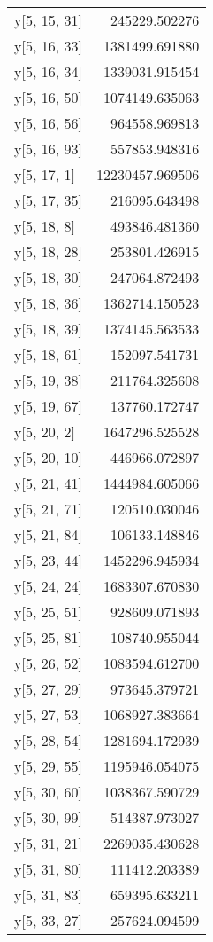 \begin{longtable}{lr}
y[5, 15, 31] & 245229.502276 \\
y[5, 16, 33] & 1381499.691880 \\
y[5, 16, 34] & 1339031.915454 \\
y[5, 16, 50] & 1074149.635063 \\
y[5, 16, 56] & 964558.969813 \\
y[5, 16, 93] & 557853.948316 \\
y[5, 17, 1] & 12230457.969506 \\
y[5, 17, 35] & 216095.643498 \\
y[5, 18, 8] & 493846.481360 \\
y[5, 18, 28] & 253801.426915 \\
y[5, 18, 30] & 247064.872493 \\
y[5, 18, 36] & 1362714.150523 \\
y[5, 18, 39] & 1374145.563533 \\
y[5, 18, 61] & 152097.541731 \\
y[5, 19, 38] & 211764.325608 \\
y[5, 19, 67] & 137760.172747 \\
y[5, 20, 2] & 1647296.525528 \\
y[5, 20, 10] & 446966.072897 \\
y[5, 21, 41] & 1444984.605066 \\
y[5, 21, 71] & 120510.030046 \\
y[5, 21, 84] & 106133.148846 \\
y[5, 23, 44] & 1452296.945934 \\
y[5, 24, 24] & 1683307.670830 \\
y[5, 25, 51] & 928609.071893 \\
y[5, 25, 81] & 108740.955044 \\
y[5, 26, 52] & 1083594.612700 \\
y[5, 27, 29] & 973645.379721 \\
y[5, 27, 53] & 1068927.383664 \\
y[5, 28, 54] & 1281694.172939 \\
y[5, 29, 55] & 1195946.054075 \\
y[5, 30, 60] & 1038367.590729 \\
y[5, 30, 99] & 514387.973027 \\
y[5, 31, 21] & 2269035.430628 \\
y[5, 31, 80] & 111412.203389 \\
y[5, 31, 83] & 659395.633211 \\
y[5, 33, 27] & 257624.094599 \\

\end{longtable}
